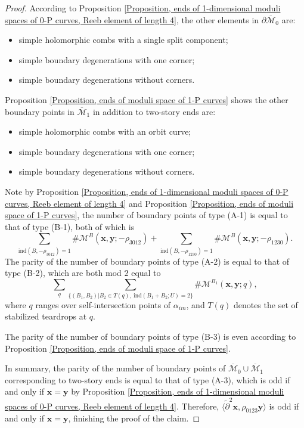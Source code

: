 \documentclass[10pt,a4paper]{amsart}
\begin{document}
\begin{proof}
According to Proposition \ref{Proposition, ends of 1-dimensional moduli spaces of 0-P curves, Reeb element of length 4}, the other elements in $\partial \overline{\mathcal{M}}_0$ are: 
\begin{itemize}
\item[(A-1)]simple holomorphic combs with a single split component;
\item[(A-2)]simple boundary degenerations with one corner;
\item[(A-3)]simple boundary degenerations without corners.
\end{itemize}
Proposition \ref{Proposition, ends of moduli space of 1-P curves} shows the other boundary points in $\overline{\mathcal{M}}_1$ in addition to two-story ends are: 
\begin{itemize}
\item[(B-1)]simple holomorphic combs with an orbit curve;
\item[(B-2)]simple boundary degenerations with one corner;
\item[(B-3)]simple boundary degenerations without corners.
\end{itemize}
Note by Proposition \ref{Proposition, ends of 1-dimensional moduli spaces of 0-P curves, Reeb element of length 4} and Proposition \ref{Proposition, ends of moduli space of 1-P curves}, the number of boundary points of type (A-1) is equal to that of type (B-1), both of which is $$\sum_{\text{ind}(B,-\rho_{3012})=1} \#\mathcal{M}^B(\bm{x},\bm{y};-\rho_{3012})+\sum_{\text{ind}(B,-\rho_{1230})=1} \#\mathcal{M}^B(\bm{x},\bm{y};-\rho_{1230}).$$
The parity of the number of boundary points of type (A-2) is equal to that of type (B-2), which are both mod $2$ equal to $$\sum_ {q}\sum_{\{(B_1,B_2)|B_2\in T(q),\ \text{ind}(B_1+B_2;U)=2\}} \#\mathcal{M}^{B_1}(\bm{x},\bm{y};q),$$
where $q$ ranges over self-intersection points of $\alpha_{im}$, and $T(q)$ denotes the set of stabilized teardrops at $q$. 

The parity of the number of boundary points of type (B-3) is even according to Proposition \ref{Proposition, ends of moduli space of 1-P curves}. 

In summary, the parity of the number of boundary points of $\overline{\mathcal{M}}_0\cup \overline{\mathcal{M}}_1$ corresponding to two-story ends is equal to that of type (A-3), which is odd if and only if $\bm{x}=\bm{y}$ by Proposition \ref{Proposition, ends of 1-dimensional moduli spaces of 0-P curves, Reeb element of length 4}. Therefore, $\langle\tilde{\partial}^2\bm{x}, \rho_{0123}\bm{y}\rangle$ is odd if and only if $\bm{x}=\bm{y}$, finishing the proof of the claim. 


\end{proof}
\end{document}
